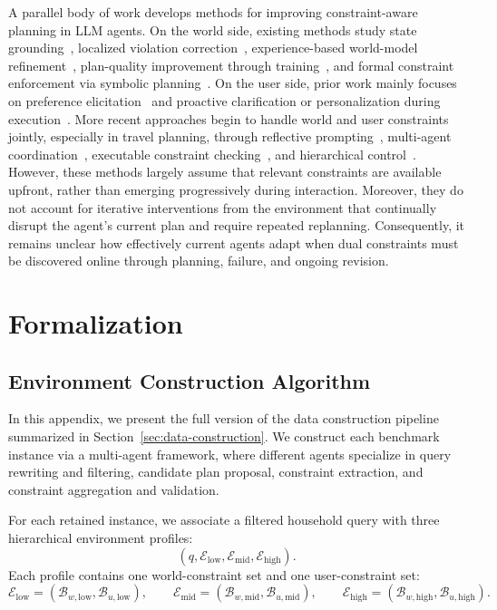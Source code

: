 A parallel body of work develops methods for improving constraint-aware planning in LLM agents. 
On the world side, existing methods study state grounding~\citep{ReflAct}, localized violation correction~\citep{L-ICL}, experience-based world-model refinement~\citep{XENON}, plan-quality improvement through training~\citep{Plan-and-Act}, and formal constraint enforcement via symbolic planning~\citep{end-2-end-pddl}. 
On the user side, prior work mainly focuses on preference elicitation~\citep{userrl,TO-GATE} and proactive clarification or personalization during execution~\citep{Ask-before-Plan,sun2025trainingproactivepersonalizedllm,huang2025adactrl}. 
More recent approaches begin to handle world and user constraints jointly, especially in travel planning, through reflective prompting~\citep{MIRROR}, multi-agent coordination~\citep{ATLAS}, executable constraint checking~\citep{SCOPE}, and hierarchical control~\citep{HiMAP-Travel}. 
However, these methods largely assume that relevant constraints are available upfront, rather than emerging progressively during interaction. Moreover, they do not account for iterative interventions from the environment that continually disrupt the agent’s current plan and require repeated replanning. Consequently, it remains unclear how effectively current agents adapt when dual constraints must be discovered online through planning, failure, and ongoing revision.

\section{Formalization}
\label{app:formalization}

\subsection{Environment Construction Algorithm}
\label{app:env_cons_algorithm}

In this appendix, we present the full version of the data construction pipeline summarized in Section~\ref{sec:data-construction}. We construct each benchmark instance via a multi-agent framework, where different agents specialize in query rewriting and filtering, candidate plan proposal, constraint extraction, and constraint aggregation and validation.

For each retained instance, we associate a filtered household query with three hierarchical environment profiles:
\[
\left(
q,
\mathcal{E}_{\mathrm{low}},
\mathcal{E}_{\mathrm{mid}},
\mathcal{E}_{\mathrm{high}}
\right).
\]
Each profile contains one world-constraint set and one user-constraint set:
\[
\mathcal{E}_{\mathrm{low}}
=
\left(
\mathcal{B}_{w,\mathrm{low}},
\mathcal{B}_{u,\mathrm{low}}
\right),
\qquad
\mathcal{E}_{\mathrm{mid}}
=
\left(
\mathcal{B}_{w,\mathrm{mid}},
\mathcal{B}_{u,\mathrm{mid}}
\right),
\qquad
\mathcal{E}_{\mathrm{high}}
=
\left(
\mathcal{B}_{w,\mathrm{high}},
\mathcal{B}_{u,\mathrm{high}}
\right).
\]

